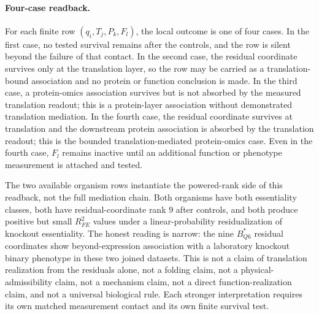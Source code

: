 \paragraph{Four-case readback.}
For each finite row $(q_i,T_j,P_k,F_l)$, the local outcome is one of four cases.  In the first case, no tested survival remains after the controls, and the row is silent beyond the failure of that contact.  In the second case, the residual coordinate survives only at the translation layer, so the row may be carried as a translation-bound association and no protein or function conclusion is made.  In the third case, a protein-omics association survives but is not absorbed by the measured translation readout; this is a protein-layer association without demonstrated translation mediation.  In the fourth case, the residual coordinate survives at translation and the downstream protein association is absorbed by the translation readout; this is the bounded translation-mediated protein-omics case.  Even in the fourth case, $F_l$ remains inactive until an additional function or phenotype measurement is attached and tested.

The two available organism rows instantiate the powered-rank side of this readback, not the full mediation chain.  Both organisms have both essentiality classes, both have residual-coordinate rank $9$ after controls, and both produce positive but small $R^2_{FE}$ values under a linear-probability residualization of knockout essentiality.  The honest reading is narrow: the nine $B^{*}_{Q6}$ residual coordinates show beyond-expression association with a laboratory knockout binary phenotype in these two joined datasets.  This is not a claim of translation realization from the residuals alone, not a folding claim, not a physical-admissibility claim, not a mechanism claim, not a direct function-realization claim, and not a universal biological rule.  Each stronger interpretation requires its own matched measurement contact and its own finite survival test.

